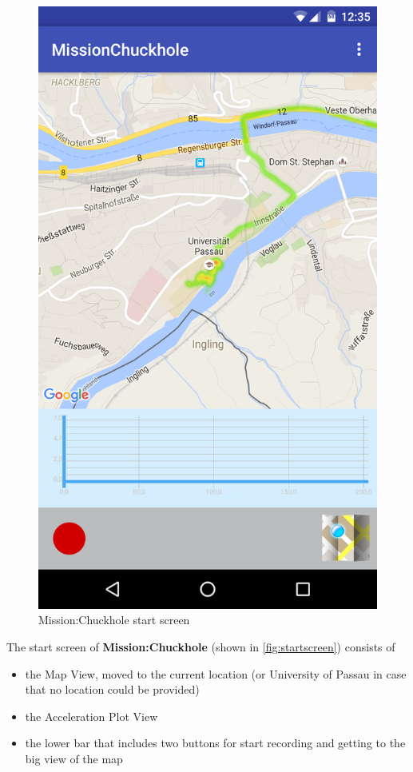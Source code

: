 \documentclass[10pt,a4paper]{article} %
\begin{document}
		\begin{figure}[h]
		\begin{center}
 		  \includegraphics[scale=0.1]{img/startscreen.png}
		  \caption{Mission:Chuckhole start screen}
		  \label{fig:startscreen}
		\end{center}
		\end{figure}

	The start screen of \textbf{Mission:Chuckhole} (shown in \autoref{fig:startscreen}) consists of 			
		\begin{itemize}
			\item the Map View, moved to the current location (or University of Passau in case that no location could be provided)
			\item the Acceleration Plot View
			\item the lower bar that includes two buttons for start recording and getting to the big view of the map
		\end{itemize}
\end{document}
